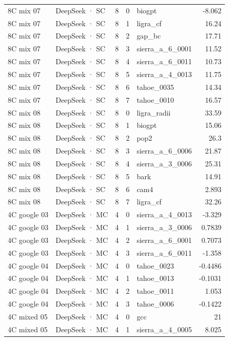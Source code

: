 \begin{tabular}{llrrlr}
8C mix 07 & DeepSeek · SC & 8 & 0 & biogpt & -8.062 \\
8C mix 07 & DeepSeek · SC & 8 & 1 & ligra\_cf & 16.24 \\
8C mix 07 & DeepSeek · SC & 8 & 2 & gap\_bc & 17.71 \\
8C mix 07 & DeepSeek · SC & 8 & 3 & sierra\_a\_6\_0001 & 11.52 \\
8C mix 07 & DeepSeek · SC & 8 & 4 & sierra\_a\_6\_0011 & 10.73 \\
8C mix 07 & DeepSeek · SC & 8 & 5 & sierra\_a\_4\_0013 & 11.75 \\
8C mix 07 & DeepSeek · SC & 8 & 6 & tahoe\_0035 & 14.34 \\
8C mix 07 & DeepSeek · SC & 8 & 7 & tahoe\_0010 & 16.57 \\
8C mix 08 & DeepSeek · SC & 8 & 0 & ligra\_radii & 33.59 \\
8C mix 08 & DeepSeek · SC & 8 & 1 & biogpt & 15.06 \\
8C mix 08 & DeepSeek · SC & 8 & 2 & pop2 & 26.3 \\
8C mix 08 & DeepSeek · SC & 8 & 3 & sierra\_a\_6\_0006 & 21.87 \\
8C mix 08 & DeepSeek · SC & 8 & 4 & sierra\_a\_3\_0006 & 25.31 \\
8C mix 08 & DeepSeek · SC & 8 & 5 & bark & 14.91 \\
8C mix 08 & DeepSeek · SC & 8 & 6 & cam4 & 2.893 \\
8C mix 08 & DeepSeek · SC & 8 & 7 & ligra\_cf & 32.26 \\
4C google 03 & DeepSeek · MC & 4 & 0 & sierra\_a\_4\_0013 & -3.329 \\
4C google 03 & DeepSeek · MC & 4 & 1 & sierra\_a\_3\_0006 & 0.7839 \\
4C google 03 & DeepSeek · MC & 4 & 2 & sierra\_a\_6\_0001 & 0.7073 \\
4C google 03 & DeepSeek · MC & 4 & 3 & sierra\_a\_6\_0011 & -1.358 \\
4C google 04 & DeepSeek · MC & 4 & 0 & tahoe\_0023 & -0.4486 \\
4C google 04 & DeepSeek · MC & 4 & 1 & tahoe\_0013 & -0.1031 \\
4C google 04 & DeepSeek · MC & 4 & 2 & tahoe\_0011 & 1.053 \\
4C google 04 & DeepSeek · MC & 4 & 3 & tahoe\_0006 & -0.1422 \\
4C mixed 05 & DeepSeek · MC & 4 & 0 & gcc & 21 \\
4C mixed 05 & DeepSeek · MC & 4 & 1 & sierra\_a\_4\_0005 & 8.025 \\

\end{tabular}
